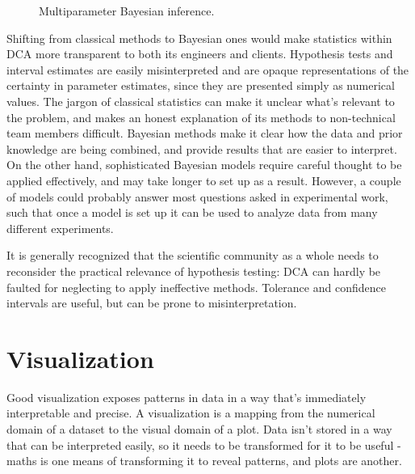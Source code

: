 \documentclass[11pt,a4paper,article]{memoir} %
\begin{document}
\begin{figure}
\centering
{}
\caption{Multiparameter Bayesian inference.}
\label{fig:multiparameter_bayes}
\end{figure}

Shifting from classical methods to Bayesian ones would make statistics within DCA more transparent to both its engineers and clients. Hypothesis tests and interval estimates are easily misinterpreted and are opaque representations of the certainty in parameter estimates, since they are presented simply as numerical values. The jargon of classical statistics can make it unclear what's relevant to the problem, and makes an honest explanation of its methods to non-technical team members difficult. Bayesian methods make it clear how the data and prior knowledge are being combined, and provide results that are easier to interpret. On the other hand, sophisticated Bayesian models require careful thought to be applied effectively, and  may take longer to set up as a result. However, a couple of models could probably answer most questions asked in experimental work, such that once a model is set up it can be used to analyze data from many different experiments.
\par
It is generally recognized that the scientific community as a whole needs to reconsider the practical relevance of hypothesis testing: DCA can hardly be faulted for neglecting to apply ineffective methods. Tolerance and confidence intervals are useful, but can be prone to misinterpretation. 

\section{Visualization}
\label{suggested_vis}
Good visualization exposes patterns in data in a way that's immediately interpretable and precise. A visualization is a mapping from the numerical domain of a dataset to the visual domain of a plot. Data isn't stored in a way that can be interpreted easily, so it needs to be transformed for it to be useful - maths is one means of transforming it to reveal patterns, and plots are another.
\end{document}
